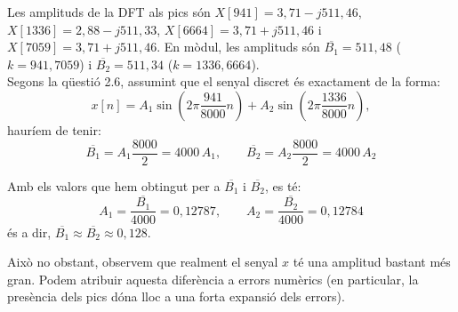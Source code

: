 \documentclass[11pt,a4]{article}
\numberwithin{equation}{section}
\theoremstyle{thmstyle}
\theoremstyle{thmstyle}
\theoremstyle{thmstyle}
\theoremstyle{thmstyle}
\theoremstyle{thmstyle}
\theoremstyle{thmstyle}
\theoremstyle{thmstyle}
\begin{document}
Les amplituds de la DFT als pics són $X[941] = 3,71-j511,46$, $X[1336] = 2,88-j511,33$, $X[6664] = 3,71+j511,46$ i $X[7059] = 3,71+j511,46$. En mòdul, les amplituds són $\overline{B_1}=511,48$ ($k=941,7059$) i $\overline{B_2}=511,34$ ($k=1336,6664$).
\\

Segons la qüestió 2.6, assumint que el senyal discret és exactament de la forma:
$$
x[n] = A_1 \sin(2\pi\frac{941}{8000}n) + A_2 \sin(2\pi\frac{1336}{8000}n),
$$
hauríem de tenir:
$$
\overline{B_1}=A_1\frac{8000}{2}=4000\,A_1,\quad \quad \overline{B_2}=A_2\frac{8000}{2}=4000\,A_2
$$

Amb els valors que hem obtingut per a $\overline{B_1}$ i $\overline{B_2}$, es té:
$$
A_1=\frac{\overline{B_1}}{4000}=0,12787,\quad\quad A_2=\frac{\overline{B_2}}{4000}=0,12784
$$
és a dir, $\overline{B_1}\approx\overline{B_2}\approx0,128$.

Això no obstant, observem que realment el senyal $x$ té una amplitud bastant més gran. Podem atribuir aquesta diferència a errors numèrics (en particular, la presència dels pics dóna lloc a una forta expansió dels errors).
\end{document}

